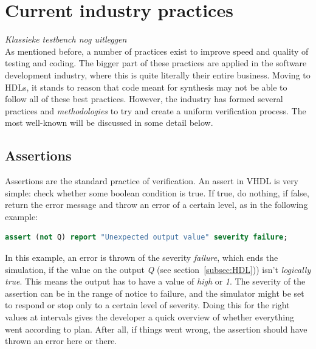 \documentclass[11pt,british]{article}
\begin{document}
\newpage

\section{Current industry practices}
\emph{\color{red}Klassieke testbench nog uitleggen}\\
\label{sec:industry}
As mentioned before, a number of practices exist to improve speed and quality of testing and coding. The bigger part of these practices are applied in the software development industry, where this is quite literally their entire business. Moving to \gls{HDL}s, it stands to reason that code meant for synthesis may not be able to follow all of these best practices. However, the industry has formed several practices and \emph{methodologies} to try and create a uniform verification process. The most well-known will be discussed in some detail below.

\subsection{Assertions}
\label{subsec:assertions}
Assertions are the standard practice of verification. An assert in VHDL is very simple: check whether some boolean condition is true. If true, do nothing, if false, return the error message and throw an error of a certain level, as in the following example:
\begin{lstlisting}[language=VHDL, tabsize=4, frame=single, framesep=3mm, belowskip=8pt, aboveskip=8pt, showstringspaces=false, basicstyle=\small, linewidth=\textwidth]
assert (not Q) report "Unexpected output value" severity failure;
\end{lstlisting}
In this example, an error is thrown of the severity \emph{failure}, which ends the simulation, if the value on the output \emph{Q} (see section~\ref{subsec:HDL})) isn't \emph{logically true}. This means the output has to have a value of \emph{high} or \emph{1}. The severity of the assertion can be in the range of notice to failure, and the simulator might be set to respond or stop only to a certain level of severity. Doing this for the right values at intervals gives the developer a quick overview of whether everything went according to plan. After all, if things went wrong, the assertion should have thrown an error here or there.
\end{document}
